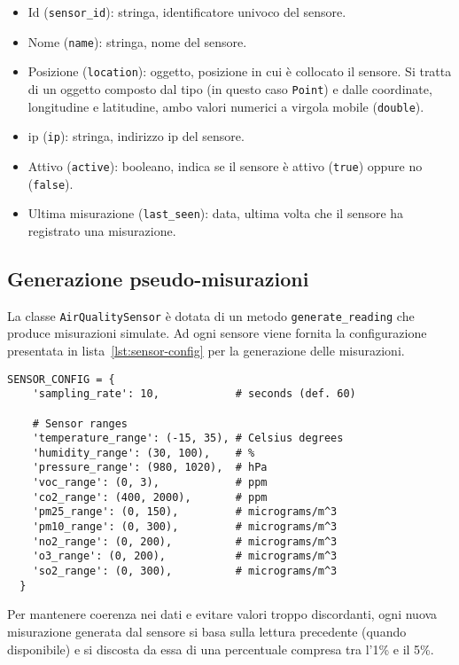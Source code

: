\begin{itemize}
  \item Id (\texttt{sensor\_id}): stringa, identificatore univoco del sensore.
  \item Nome (\texttt{name}): stringa, nome del sensore.
  \item Posizione (\texttt{location}): oggetto, posizione in cui è collocato il sensore.
        Si tratta di un oggetto composto dal tipo (in questo caso \texttt{Point}) e dalle coordinate,
        longitudine e latitudine, ambo valori numerici a virgola mobile (\texttt{double}).
  \item \acrshort{ip} (\texttt{ip}): stringa, indirizzo ip del sensore.
  \item Attivo (\texttt{active}): booleano, indica se il sensore è attivo (\texttt{true})
        oppure no (\texttt{false}).
  \item Ultima misurazione (\texttt{last\_seen}): data, ultima volta che il sensore ha registrato una misurazione.
        \label{lst:sensors-properties}
\end{itemize}

\subsection{Generazione pseudo-misurazioni}

La classe \texttt{AirQualitySensor} è dotata di un metodo \texttt{generate\_reading} che produce misurazioni simulate.
Ad ogni sensore viene fornita la configurazione presentata in lista~\ref{lst:sensor-config} per la generazione
delle misurazioni.

\begin{lstlisting}[caption={Configurazione sensore}, label=lst:sensor-config]
  SENSOR_CONFIG = {
    'sampling_rate': 10,            # seconds (def. 60)

    # Sensor ranges
    'temperature_range': (-15, 35), # Celsius degrees
    'humidity_range': (30, 100),    # %
    'pressure_range': (980, 1020),  # hPa
    'voc_range': (0, 3),            # ppm
    'co2_range': (400, 2000),       # ppm
    'pm25_range': (0, 150),         # micrograms/m^3
    'pm10_range': (0, 300),         # micrograms/m^3
    'no2_range': (0, 200),          # micrograms/m^3
    'o3_range': (0, 200),           # micrograms/m^3
    'so2_range': (0, 300),          # micrograms/m^3
  }
\end{lstlisting}

Per mantenere coerenza nei dati e evitare valori troppo discordanti, ogni nuova misurazione generata dal sensore
si basa sulla lettura precedente (quando disponibile) e si discosta da essa di una percentuale compresa tra
l'1\% e il 5\%.

